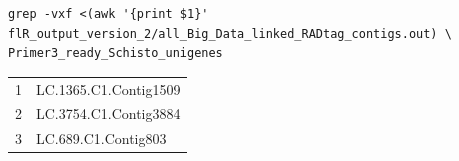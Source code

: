 \documentclass{article}\usepackage[]{graphicx}\usepackage[]{color}
\begin{document}
\begin{command}
\captionsetup{type=command}
\begin{Verbatim} 
grep -vxf <(awk '{print $1}' flR_output_version_2/all_Big_Data_linked_RADtag_contigs.out) \
Primer3_ready_Schisto_unigenes
\end{Verbatim}
\caption{Command that determines the ID of \textit{Schistocerca} unigenes that have been detected by the old version of \texttt{find\_linked\_RADtags.pl} but not with the new version. The command prints out lines from the second file (Primer3\_ready\_Schisto\_unigenes) that have not been matched by the patterns (here: unigene ID's) in the first "file": <(...). I need to provide a file to the "-f" switch of \texttt{grep}, but I only want to present the first column of all\_Big\_Data\_linked\_RADtag\_contigs.out as patterns. So I am using a \href{http://www.vincebuffalo.com/2013/08/08/the-mighty-named-pipe.html}{process substitution} with \texttt{<(...)} instead of an intermediate file.}
\label{process-subst}
\end{command}

\begin{table}[h]
\hspace{20pt}
\begin{tabular}{ll}
\toprule
     1	& LC.1365.C1.Contig1509 \\
     2	& LC.3754.C1.Contig3884 \\
     3	& LC.689.C1.Contig803 \\
\bottomrule
\end{tabular}
\end{table}
\end{document}
